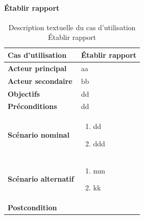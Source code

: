         \paragraph[Établir rapport]{Établir rapport}
        \begin{longtable}{p{4cm} p{9cm}}
            \caption{Description textuelle du cas d’utilisation Établir rapport}
            \label{table:usecaseEtablirCompte}
            \\\hline\hline
                \textbf{Cas d’utilisation} & \textbf{Établir rapport}
            \\\hline\hline
                    \textbf{Acteur principal} & aa
                \\
                    \textbf{Acteur secondaire} & bb
                \\
                    \textbf{Objectifs} & dd
                \\
                    \textbf{Préconditions} & dd
                \\
                \textbf{Scénario nominal} &
                    \begin{enumerate}[leftmargin=*]
                        \item dd
                        \item ddd
                    \end{enumerate}
                \\
                \textbf{Scénario alternatif} &
                    \begin{enumerate}[leftmargin=*]
                        \item mm
                        \item kk
                    \end{enumerate}
                \\
                \textbf{Postcondition}
            \\\bottomrule
        \end{longtable}

